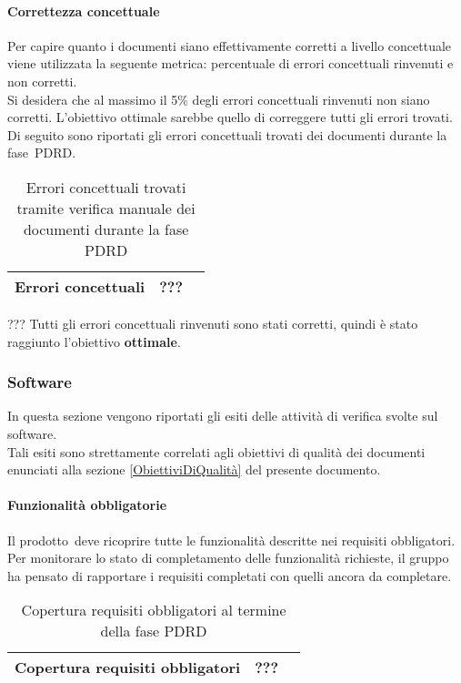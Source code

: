 \documentclass[../PianoDiQualifica.tex]{subfiles}
\begin{document}
\begin{appendices}
			\paragraph{Correttezza concettuale}
			Per capire quanto i documenti siano effettivamente corretti a livello concettuale viene utilizzata la seguente metrica: percentuale di errori concettuali rinvenuti e non corretti.\\
			Si desidera che al massimo il 5\% degli errori concettuali rinvenuti non siano corretti. L'obiettivo ottimale sarebbe quello di correggere tutti gli errori trovati. \\
			Di seguito sono riportati gli errori concettuali trovati dei documenti durante la fase\g\ PDRD.
			\begin{table}[H]
				\centering
				\begin{tabular}{l * {2}{c}}
					\midrule
					Errori concettuali & ??? \\
					\midrule
				\end{tabular}
				\caption{Errori concettuali trovati tramite verifica manuale dei documenti durante la fase PDRD}
				\label{tab:errori_concettuali}
			\end{table}
			??? Tutti gli errori concettuali rinvenuti sono stati corretti, quindi è stato raggiunto l'obiettivo \textbf{ottimale}.
			
			
		\subsubsection{Software}
		In questa sezione vengono riportati gli esiti delle attività di verifica svolte sul software.\\
		Tali esiti sono strettamente correlati agli obiettivi di qualità dei documenti enunciati alla sezione \ref{ObiettiviDiQualità} del presente documento.
		
			\paragraph{Funzionalità obbligatorie}
				Il prodotto\g\ deve ricoprire tutte le funzionalità descritte nei requisiti obbligatori. Per monitorare lo stato di completamento delle funzionalità richieste, il gruppo ha pensato di rapportare i requisiti completati con quelli ancora da completare.
				\begin{table}[H]
				\centering
				\begin{tabular}{l * {2}{c}}
					\midrule
					Copertura requisiti obbligatori & ??? \\
					\midrule
				\end{tabular}
				\caption{Copertura requisiti obbligatori al termine della fase PDRD}
				\label{tab:copertura_requisiti_obbligatori}
			\end{table}
			

\end{appendices}
\end{document}
